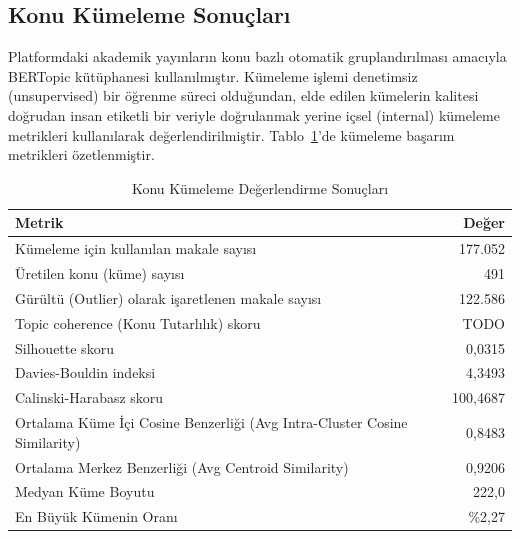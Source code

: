 \subsection{Konu Kümeleme Sonuçları}
Platformdaki akademik yayınların konu bazlı otomatik gruplandırılması amacıyla BERTopic kütüphanesi kullanılmıştır. Kümeleme işlemi denetimsiz (unsupervised) bir öğrenme süreci olduğundan, elde edilen kümelerin kalitesi doğrudan insan etiketli bir veriyle doğrulanmak yerine içsel (internal) kümeleme metrikleri kullanılarak değerlendirilmiştir. Tablo~\ref{tab:kumeleme_sonuclari}'de kümeleme başarım metrikleri özetlenmiştir.

\begin{table}[H]
\centering
\caption{Konu Kümeleme Değerlendirme Sonuçları}
\label{tab:kumeleme_sonuclari}
\begin{tabular}{lr}
\hline
Metrik & Değer \\
\hline
Kümeleme için kullanılan makale sayısı & 177.052 \\
Üretilen konu (küme) sayısı & 491 \\
Gürültü (Outlier) olarak işaretlenen makale sayısı & 122.586 \\
Topic coherence (Konu Tutarlılık) skoru & TODO \\
Silhouette skoru & 0,0315 \\
Davies-Bouldin indeksi & 4,3493 \\
Calinski-Harabasz skoru & 100,4687 \\
Ortalama Küme İçi Cosine Benzerliği (Avg Intra-Cluster Cosine Similarity) & 0,8483 \\
Ortalama Merkez Benzerliği (Avg Centroid Similarity) & 0,9206 \\
Medyan Küme Boyutu & 222,0 \\
En Büyük Kümenin Oranı & \%2,27 \\
\hline
\end{tabular}
\end{table}

